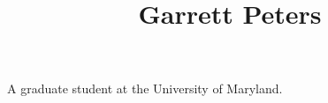 \documentclass[a4paper]{article}
\title{Garrett Peters}
\date{}
\begin{document}
\maketitle
\par{A graduate student at the University of Maryland.}
\printbibliography
\end{document}
